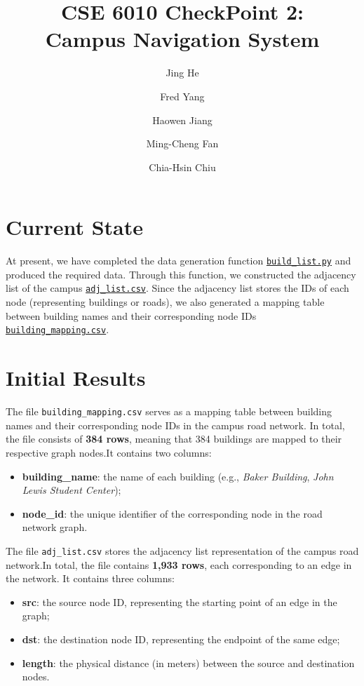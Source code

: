 \documentclass[fleqn,10pt]{olplainarticle}
\title{CSE 6010 CheckPoint 2: \\Campus Navigation System}
\author[1]{Jing He}
\author[2]{Fred Yang}
\author[3]{Haowen Jiang}
\author[4]{Ming-Cheng Fan}
\author[5]{Chia-Hsin Chiu}
\affil[1]{jhe468@gatech.edu}
\affil[2]{fred.yang@gatech.edu}
\affil[3]{hjiang401@gatech.edu}
\affil[4]{mfan77@gatech.edu}
\affil[5]{cchiu73@gatech.edu}
\begin{document}
\flushbottom
\maketitle


\section*{Current State}
At present, we have completed the data generation function 
\href{https://github.com/fredkyang/cse6010-buzznav/blob/main/data/build_list.py}{\texttt{build\_list.py}} and produced the required data. Through this function, we constructed the adjacency list of the campus \href{https://github.com/fredkyang/cse6010-buzznav/blob/main/data/adj_list.csv}{\texttt{adj\_list.csv}}. Since the adjacency list stores the IDs of each node (representing buildings or roads), we also generated a mapping table between building names and their corresponding node IDs \href{}{\texttt{building\_mapping.csv}}.

\section*{Initial Results}
The file \texttt{building\_mapping.csv} serves as a mapping table between building names and their corresponding node IDs in the campus road network. In total, the file consists of \textbf{384 rows}, meaning that 384 buildings are mapped to their respective graph nodes.It contains two columns:

\begin{itemize}
    \item \textbf{building\_name}: the name of each building (e.g., \textit{Baker Building}, \textit{John Lewis Student Center});
    \item \textbf{node\_id}: the unique identifier of the corresponding node in the road network graph.
\end{itemize}

The file \texttt{adj\_list.csv} stores the adjacency list representation of the campus road network.In total, the file contains \textbf{1,933 rows}, each corresponding to an edge in the network. It contains three columns:

\begin{itemize}
    \item \textbf{src}: the source node ID, representing the starting point of an edge in the graph;
    \item \textbf{dst}: the destination node ID, representing the endpoint of the same edge;
    \item \textbf{length}: the physical distance (in meters) between the source and destination nodes.
\end{itemize}
\end{document}
